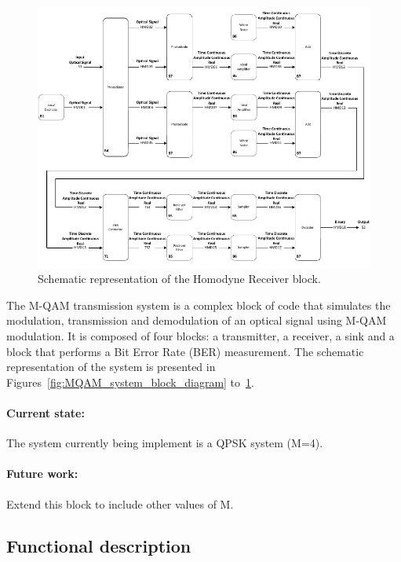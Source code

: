 \begin{refsection}
\begin{figure}[H]
	\centering
	\includegraphics[width=1\textwidth]{./sdf/m_qam_system/figures/simulation_rx}
	\caption{Schematic representation of the Homodyne Receiver block.}\label{fig:simulation_rx}
\end{figure}

The M-QAM transmission system is a complex block of code that simulates the
modulation, transmission and
demodulation of an optical signal using M-QAM modulation.
It is composed of four blocks: a transmitter, a receiver, a sink and a block
that performs a Bit Error Rate (BER) measurement. The schematic representation
of the
system is presented in Figures~\ref{fig:MQAM_system_block_diagram}
to~\ref{fig:simulation_rx}.
	
\paragraph{Current state:} The system currently being implement is a QPSK system (M=4).

\paragraph{Future work:} Extend this block to include other values of M.

\subsection*{Functional description}


\end{refsection}
